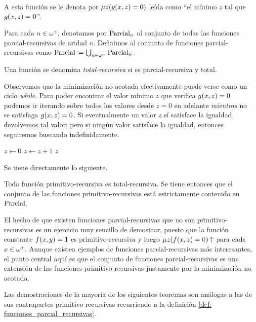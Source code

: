 \begin{definition}
\begin{enumerate}
		A esta función se le denota por $\mu z\pa*{g\pa*{x, z} = 0}$ leída como ``el mínimo $z$ tal que $g\pa*{x, z} = 0$''.
	\end{enumerate}

	Para cada $n\in\omega^{+}$, denotamos por $\mathrm{Parcial}_{n}$ al conjunto de todas las funciones parcial-recursivas de aridad $n$. Definimos al conjunto de funciones parcial-recursivas como $\mathrm{Parcial}\coloneqq\bigcup_{n\in\omega^{+}}\mathrm{Parcial}_{n}$.

	Una función se denomina \emph{total-recursiva} si es parcial-recursiva y total.
\end{definition}

Observemos que la minimización no acotada efectivamente puede verse como un ciclo \emph{while}. Para poder encontrar el valor mínimo $z$ que verifica $g\pa*{x, z} = 0$ podemos ir iterando sobre todos los valores desde $z = 0$ en adelante \emph{mientras} no se satisfaga $g\pa*{x, z} = 0$. Si eventualmente un valor $z$ sí satisface la igualdad, devolvemos tal valor; pero si ningún valor satisface la igualdad, entonces seguiremos buscando indefinidamente.

\begin{algorithm}[h!]
	\caption{\emph{While}}

	\begin{algorithmic}
		\State $z\gets 0$
		\State $z\gets z + 1$
		\EndWhile
		\State \Return $z$
	\end{algorithmic}
\end{algorithm}

Se tiene directamente lo siguiente.

\begin{theorem}
	Toda función primitivo-recursiva es total-recursiva. Se tiene entonces que el conjunto de las funciones primitivo-recursivas está estrictamente contenido en $\mathrm{Parcial}$.
\end{theorem}

El hecho de que existen funciones parcial-recursivas que no son primitivo-recursivas es un ejercicio muy sencillo de demostrar, puesto que la función constante $f\pa*{x, y} = 1$ es primitivo-recursiva y luego $\mu z\pa*{f\pa*{x, z} = 0}\DIVERGE$ para cada $x\in\omega^{+}$. Aunque existen ejemplos de funciones parcial-recursivas más interesantes, el punto central aquí es que el conjunto de funciones parcial-recursivas es una extensión de las funciones primitivo-recursivas justamente por la minimización no acotada.

Las demostraciones de la mayoría de los siguientes teoremas son análogas a las de sus contrapartes primitivo-recursivas recurriendo a la definición \ref{def: funciones_parcial_recursivas}.

